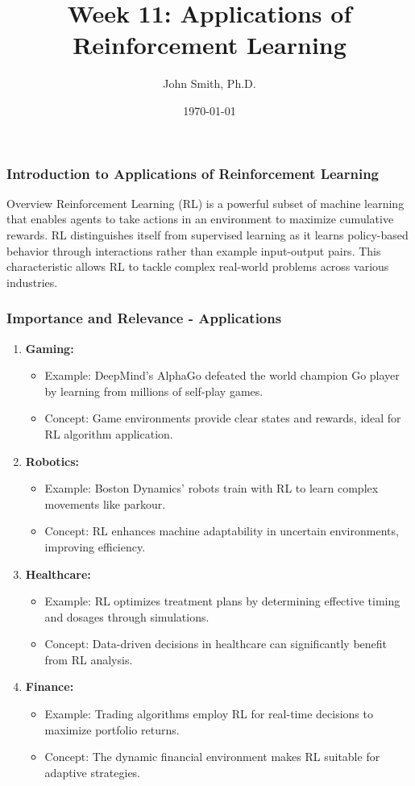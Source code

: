 \documentclass[aspectratio=169]{beamer}
\title[Applications of Reinforcement Learning]{Week 11: Applications of Reinforcement Learning}
\author[J. Smith]{John Smith, Ph.D.}
\institute[University Name]{
  Department of Computer Science\\
  University Name\\
  \vspace{0.3cm}
  Email: email@university.edu\\
  Website: www.university.edu
}
\date{\today}
\begin{document}
\frame{\titlepage}

\begin{frame}[fragile]
    \frametitle{Introduction to Applications of Reinforcement Learning}
    \begin{block}{Overview}
        Reinforcement Learning (RL) is a powerful subset of machine learning that enables agents to take actions in an environment to maximize cumulative rewards. RL distinguishes itself from supervised learning as it learns policy-based behavior through interactions rather than example input-output pairs. This characteristic allows RL to tackle complex real-world problems across various industries.
    \end{block}
\end{frame}

\begin{frame}[fragile]
    \frametitle{Importance and Relevance - Applications}
    \begin{enumerate}
        \item \textbf{Gaming:}
            \begin{itemize}
                \item Example: DeepMind's AlphaGo defeated the world champion Go player by learning from millions of self-play games.
                \item Concept: Game environments provide clear states and rewards, ideal for RL algorithm application.
            \end{itemize}
        \item \textbf{Robotics:}
            \begin{itemize}
                \item Example: Boston Dynamics' robots train with RL to learn complex movements like parkour.
                \item Concept: RL enhances machine adaptability in uncertain environments, improving efficiency.
            \end{itemize}
        \item \textbf{Healthcare:}
            \begin{itemize}
                \item Example: RL optimizes treatment plans by determining effective timing and dosages through simulations.
                \item Concept: Data-driven decisions in healthcare can significantly benefit from RL analysis.
            \end{itemize}
        \item \textbf{Finance:}
            \begin{itemize}
                \item Example: Trading algorithms employ RL for real-time decisions to maximize portfolio returns.
                \item Concept: The dynamic financial environment makes RL suitable for adaptive strategies.
            \end{itemize}
    \end{enumerate}
\end{frame}
\end{document}
